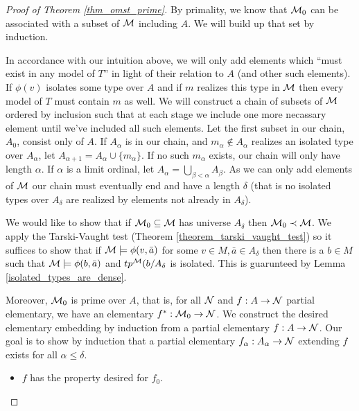 \begin{proof}[Proof of Theorem \ref{thm_omst_prime}]\label{proof_omst_prime} 
By primality, we know that \(\mathcal{M}_0\) can be associated with a subset of \(\mathcal{M}\) including \(A\). 
We will build up that set by induction. 

In accordance with our intuition above, we will only add elements which ``must exist in any model of \(T\)'' in light of their relation to \(A\) (and other such elements).
If \(\phi(v)\) isolates some type over \(A\) and if \(m\) realizes this type in \(\mathcal{M}\) then every model of \(T\) must contain \(m\) as well. 
We will construct a chain of subsets of \(\mathcal{M}\) ordered by inclusion such that at each stage we include one more necassary element until we've included all such elements. 
Let the first subset in our chain, \(A_0\), consist only of \(A\). 
If \(A_\alpha\) is in our chain, and \(m_\alpha \notin A_\alpha\) realizes an isolated type over \(A_\alpha\), let \(A_{\alpha+1} = A_\alpha \cup \{m_\alpha\}\).
If no such \(m_\alpha\) exists, our chain will only have length \(\alpha\). 
If \(\alpha\) is a limit ordinal, let \(A_\alpha = \bigcup\limits_{\beta < \alpha} A_\beta\). 
As we can only add elements of \(\mathcal{M}\) our chain must eventually end and have a length \(\delta\) (that is no isolated types over \(A_\delta\) are realized by elements not already in \(A_\delta\)).

We would like to show that if \(\mathcal{M}_0 \subseteq \mathcal{M}\) has universe \(A_\delta\) then \(\mathcal{M}_0 \prec \mathcal{M}\).
We apply the Tarski-Vaught test (Theorem \ref{theorem_tarski_vaught_test}) so it suffices to show that if \(\mathcal{M} \models \phi(v, \bar{a})\) for some \(v \in M, \bar{a} \in A_\delta\) then there is a \(b \in M\) such that \(\mathcal{M} \models \phi(b, \bar{a})\) and \(tp^{\mathcal{M}}(b/A_\delta\) is isolated. 
This is guarunteed by Lemma \ref{isolated_types_are_dense}.

Moreover, \(\mathcal{M}_0\) is prime over \(A\), that is, for all \(\mathcal{N}\) and \(f: A \to \mathcal{N}\) partial elementary, we have an elementary \(f^*: \mathcal{M}_0 \to \mathcal{N}\). 
We construct the desired elementary embedding by induction from a partial elementary \(f: A \to \mathcal{N}\).  
Our goal is to show by induction that a partial elementary \(f_\alpha:A_\alpha \to \mathcal{N}\) extending \(f\) exists for all \(\alpha \leq \delta\). 

\begin{itemize}
\item \(f\) has the property desired for \(f_0\). 


\end{itemize}
\end{proof}

